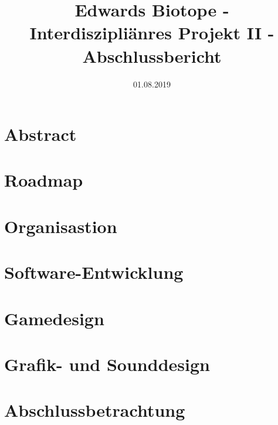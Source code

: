 \documentclass[12pt ,letterpaper]{article}
\title{Edwards Biotope - Interdiszipliänres Projekt II - Abschlussbericht}
\date{01.08.2019}
\begin{document}
\begin{onehalfspace}
\maketitle
\tableofcontents
\section{Abstract}

\section{Roadmap}

\section{Organisastion}

\section{Software-Entwicklung}



\section{Gamedesign}

\section{Grafik- und Sounddesign} 



\section{Abschlussbetrachtung}


\listoffigures
\end{onehalfspace}
\end{document}
